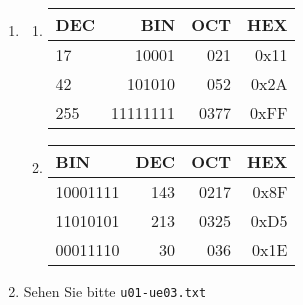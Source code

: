 \begin{enumerate}[label={Aufgabe Ü\arabic*},start=1]
\begin{enumerate}[label={\alph*.}]
\begin{enumerate}
		    		\item $\text{Bits Insgesamt} = 100 \times 1800 \times \left(28 + 16\right) \si{\bit} = \SI{7920000}{\bit}$
		    			\begin{enumerate}
			    			\item Mit Wireless LAN (IEEE 802.11n) mit \SI[per-mode=symbol]{600}{\mega\bit\per\second}:
				    			\begin{equation}
				    				\text{Zeit} = \SI{7.92}{\mega\bit} \div \SI{600}{\mega\bit\per\second} = \SI{0,0132}{\second} \nks{4}
				    			\end{equation}
			    			\item Mit Ethernet mit \SI[per-mode=symbol]{1}{\giga\bit\per\second}:
				    			\begin{equation}
				    				\text{Zeit} = \SI{7.92e-3}{\giga\bit} \div \SI{1}{\giga\bit\per\second} = \SI{0,0079}{\second} \nks{4}
				    			\end{equation}
			    		\end{enumerate}
	    		\end{enumerate}
    	\end{enumerate}
    \item \blanko
    	\begin{multicols}{2}
	    	\begin{enumerate}[label={\alph*.}]
	    		\item \blanko
	    			\begin{center}
	    				\ttfamily
	    				\begin{tabular}{lrrr}
	    					\toprule
	    					DEC & BIN & OCT & HEX \\
	    					\midrule
	    					17  & 10001    & 021  & 0x11 \\
	    					42  & 101010   & 052  & 0x2A \\
	    					255 & 11111111 & 0377 & 0xFF \\
	    					\bottomrule
	    				\end{tabular}
	    			\end{center}
	    		\item \blanko
	    			\begin{center}
	    				\ttfamily
	    				\begin{tabular}{lrrr}
	    					\toprule
	    					BIN & DEC & OCT & HEX \\
	    					\midrule
	    					10001111 & 143 & 0217 & 0x8F \\
	    					11010101 & 213 & 0325 & 0xD5 \\
	    					00011110 & 30  & 036  & 0x1E \\
	    					\bottomrule
	    				\end{tabular}
	    			\end{center}
	    	\end{enumerate}
	    \end{multicols}
    \item Sehen Sie bitte \texttt{u01-ue03.txt}
\end{enumerate}